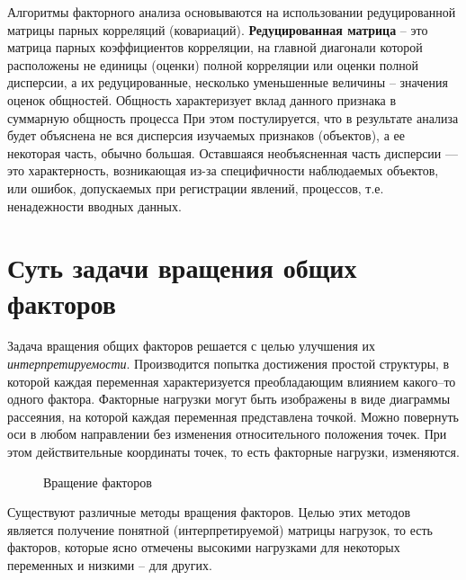 \documentclass[a4paper, 12pt]{article}
\begin{document}
Алгоритмы факторного анализа основываются на использовании редуцированной матрицы парных корреляций (ковариаций).
\textbf{Редуцированная матрица} – это матрица парных коэффициентов корреляции, на главной диагонали которой расположены не единицы (оценки) полной корреляции или оценки полной дисперсии, а их редуцированные, несколько уменьшенные величины – значения оценок общностей. Общность характеризует вклад данного признака в суммарную общность процесса
При этом постулируется, что в результате анализа будет объяснена не вся дисперсия изучаемых признаков (объектов), а ее некоторая часть, обычно большая. Оставшаяся необъясненная часть дисперсии — это характерность, возникающая из-за специфичности наблюдаемых объектов, или ошибок, допускаемых при регистрации явлений, процессов, т.е. ненадежности вводных данных.
	


\section{Суть задачи вращения общих факторов}
Задача вращения общих факторов решается с целью улучшения их {\it интерпретируемости}. Производится попытка достижения простой структуры, в которой каждая переменная характеризуется преобладающим влиянием какого–то одного фактора. Факторные нагрузки могут быть изображены в виде диаграммы рассеяния, на которой каждая переменная представлена точкой. Можно повернуть оси в любом направлении без изменения относительного положения точек. При этом действительные координаты точек, то есть факторные нагрузки, изменяются. 
\begin{figure}[h!]
    \caption{Вращение факторов}
    \label{ris:image}
    \end{figure}

Существуют различные методы вращения факторов. Целью этих методов является получение понятной (интерпретируемой) матрицы нагрузок, то есть факторов, которые ясно отмечены высокими нагрузками для некоторых переменных и низкими -- для других. 
\end{document}
